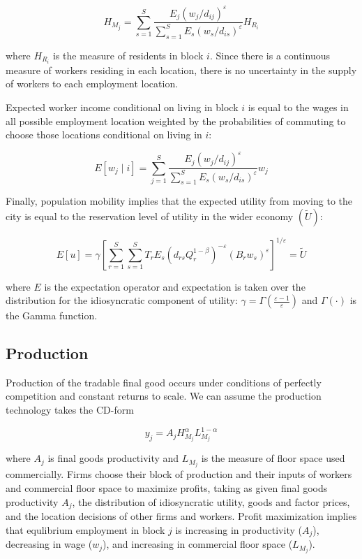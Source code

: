 \begin{equation}
  H_{M_j} = \sum_{s=1}^S \frac{E_j(w_j / d_{ij})^{\varepsilon}}{\sum_{s=1}^S E_s(w_s / d_{is})^{\varepsilon}} H_{R_i}
\end{equation}

where $H_{R_i}$ is the measure of residents in block $i$. Since there is a continuous measure of workers residing in each location, there is no uncertainty in the supply of workers to each employment location.

Expected worker income conditional on living in block $i$ is equal to the wages in all possible employment location weighted by the probabilities of commuting to choose those locations conditional on living in $i$:

\begin{equation}
  E[w_j \mid i] = \sum_{j=1}^S \frac{E_j(w_j / d_{ij})^\varepsilon}{\sum_{s=1}^S E_s(w_s / d_{is})^\varepsilon} w_j
\end{equation}

Finally, population mobility implies that the expected utility from moving to the city is equal to the reservation level of utility in the wider economy $(\tilde{U})$:

\begin{equation}
  E[u] = \gamma [\sum_{r=1}^S \sum_{s=1}^S T_r E_s(d_{rs} Q_r^{1-\beta})^{-\varepsilon} (B_r w_s)^{\varepsilon}]^{1/\varepsilon} = \tilde{U}
\end{equation}

where $E$ is the expectation operator and expectation is taken over the distribution for the idiosyncratic component of utility: $\gamma = \Gamma(\frac{\varepsilon - 1}{\varepsilon})$ and $\Gamma(\cdot)$ is the Gamma function.

\subsection{Production}

Production of the tradable final good occurs under conditions of perfectly competition and constant returns to scale. We can assume the production technology takes the CD-form

\begin{equation}
  y_j = A_j H_{M_j}^{\alpha} L_{M_j}^{1 - \alpha}
\end{equation}

where $A_j$ is final goods productivity and $L_{M_j}$ is the measure of floor space used commercially. Firms choose their block of production and their inputs of workers and commercial floor space to maximize profits, taking as given final goods productivity $A_j$, the distribution of idiosyncratic utility, goods and factor prices, and the location decisions of other firms and workers. Profit maximization implies that equlibrium employment in block $j$ is increasing in productivity ($A_j$), decreasing in wage ($w_j$), and increasing in commercial floor space ($L_{M_j}$).

